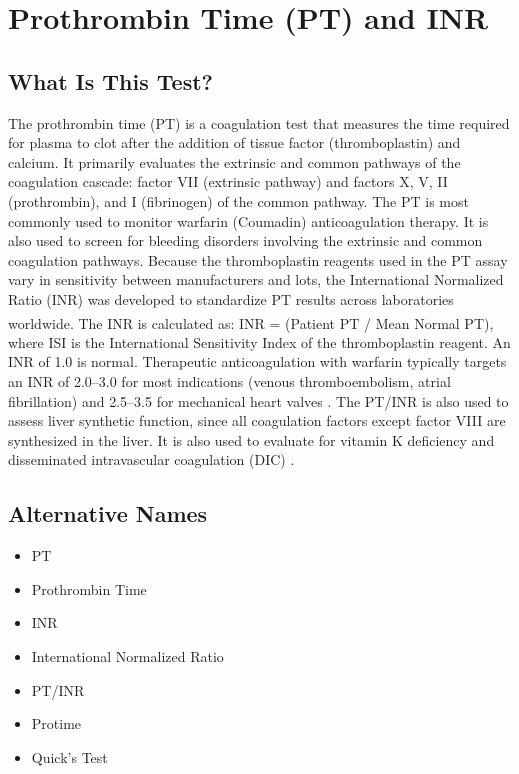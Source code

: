\chapter{Prothrombin Time (PT) and INR}

\section*{What Is This Test?}
The prothrombin time (PT) is a coagulation test that measures the time required for plasma to clot after the addition of tissue factor (thromboplastin) and calcium. It primarily evaluates the extrinsic and common pathways of the coagulation cascade: factor VII (extrinsic pathway) and factors X, V, II (prothrombin), and I (fibrinogen) of the common pathway. The PT is most commonly used to monitor warfarin (Coumadin) anticoagulation therapy. It is also used to screen for bleeding disorders involving the extrinsic and common coagulation pathways. Because the thromboplastin reagents used in the PT assay vary in sensitivity between manufacturers and lots, the International Normalized Ratio (INR) was developed to standardize PT results across laboratories worldwide. The INR is calculated as: INR = (Patient PT / Mean Normal PT)\textsuperscript{}, where ISI is the International Sensitivity Index of the thromboplastin reagent. An INR of 1.0 is normal. Therapeutic anticoagulation with warfarin typically targets an INR of 2.0--3.0 for most indications (venous thromboembolism, atrial fibrillation) and 2.5--3.5 for mechanical heart valves \cite{keeling2011guidelines}. The PT/INR is also used to assess liver synthetic function, since all coagulation factors except factor VIII are synthesized in the liver. It is also used to evaluate for vitamin K deficiency and disseminated intravascular coagulation (DIC) \cite{tierney2023current}.

\section*{Alternative Names}
\begin{itemize}
  \item PT
  \item Prothrombin Time
  \item INR
  \item International Normalized Ratio
  \item PT/INR
  \item Protime
  \item Quick's Test
\end{itemize}
